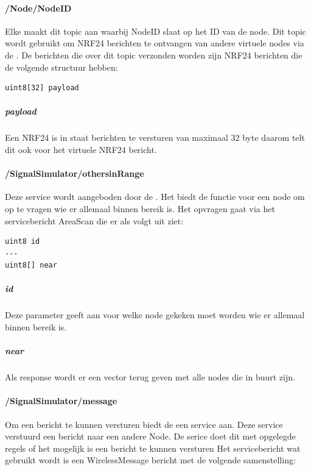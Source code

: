 \documentclass[a4paper, 11pt, oneside]{report}
\begin{document}
\paragraph{/Node/NodeID}
\label{DetailedDesign:ros:intern:rosinterfaces:topic:node}
Elke  maakt dit topic aan waarbij NodeID slaat op het ID van de node. 
Dit topic wordt gebruikt om NRF24 berichten te ontvangen van andere virtuele nodes via de .  
De berichten die over dit topic verzonden worden zijn NRF24 berichten die de volgende structuur hebben:

\begin{lstlisting} 
uint8[32] payload
\end{lstlisting}

\subparagraph{payload} Een NRF24 is in staat berichten te versturen van maximaal 32 byte daarom telt dit ook voor het virtuele NRF24 bericht.


\paragraph{/SignalSimulator/othersinRange}
\label{DetailedDesign:ros:intern:rosinterfaces:service:ss:range}
Deze service wordt aangeboden door de .
Het biedt de functie voor een node om op te vragen wie er allemaal binnen bereik is.
Het opvragen gaat via het servicebericht AreaScan die er als volgt uit ziet:

\begin{lstlisting}
uint8 id
---
uint8[] near
\end{lstlisting}

\subparagraph{id} Deze parameter geeft aan voor welke node gekeken moet worden wie er allemaal binnen bereik is.
\subparagraph{near} Als response wordt er een vector terug geven met alle nodes die in buurt zijn.

\paragraph{/SignalSimulator/message}
\label{DetailedDesign:ros:intern:rosinterfaces:service:ss:message}
Om een bericht te kunnen versturen biedt de   een service aan. 
Deze service verstuurd een bericht naar een andere Node.
De serice doet dit met opgelegde regels of het mogelijk is een bericht te kunnen versturen
Het servicebericht wat gebruikt wordt is een WirelessMessage bericht met de volgende samenstelling:
\end{document}
